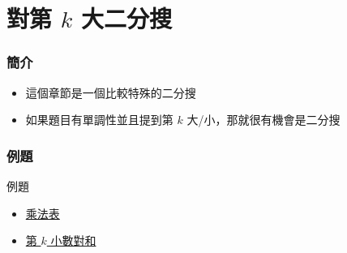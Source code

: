 \documentclass[mathserif]{beamer}
\begin{document}
\section{對第 $k$ 大二分搜}

\begin{frame}
    \frametitle{簡介}
    \begin{itemize}
        \item 這個章節是一個比較特殊的二分搜
        \item 如果題目有單調性並且提到第 $k$ 大/小，那就很有機會是二分搜
    \end{itemize}
\end{frame}

\begin{frame}
    \frametitle{例題}
    \begin{block}{例題}
        \begin{itemize}
            \item \href{https://cses.fi/problemset/task/2422}{乘法表}
            \item \href{https://codeforces.com/edu/course/2/lesson/6/5/practice/contest/285084/problem/C}{第 $k$ 小數對和}
        \end{itemize}
    \end{block}
\end{frame}
\end{document}
